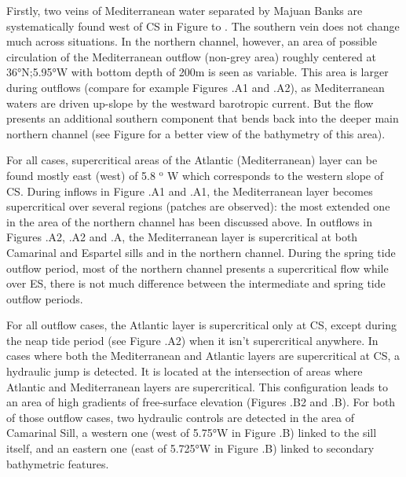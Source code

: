 Firstly, two veins of Mediterranean water separated by Majuan Banks are systematically found west of CS in Figure  to .
The southern vein does not change much across situations. In the northern channel, however, an area of possible circulation of the Mediterranean outflow (non-grey area) roughly centered at 36°N;5.95°W with bottom depth of 200m is seen as variable. This area is larger during outflows (compare for example Figures .A1 and .A2), as Mediterranean waters are driven up-slope by the westward barotropic current. But the flow presents an additional southern component that bends back into the deeper main northern channel (see Figure  for a better view of the bathymetry of this area).

For all cases, supercritical areas of the Atlantic (Mediterranean) layer can be found mostly east (west) of 5.8 $^\text{o}$ W which corresponds to the western slope of CS. During inflows in Figure .A1 and .A1, the Mediterranean layer becomes supercritical over several regions (patches are observed): the most extended one in the area of the northern channel has been discussed above. In outflows in Figures .A2, .A2 and .A, the Mediterranean layer is supercritical at both Camarinal and Espartel sills and in the northern channel.  During the spring tide outflow period, most of the northern channel presents a supercritical flow while over ES, there is not much difference between the intermediate and spring tide outflow periods.

For all outflow cases, the Atlantic layer is supercritical only at CS, except during the neap tide period (see Figure .A2) when it isn't supercritical anywhere. In cases where both the Mediterranean and Atlantic layers are supercritical at CS, a hydraulic jump is detected. It is located at the intersection of areas where Atlantic and Mediterranean layers are supercritical. This configuration leads to an area of high gradients of free-surface elevation (Figures .B2 and .B). For both of those outflow cases, two hydraulic controls are detected in the area of Camarinal Sill, a western one (west of 5.75°W in Figure .B) linked to the sill itself, and an eastern one (east of 5.725°W in Figure .B) linked to secondary bathymetric features.

